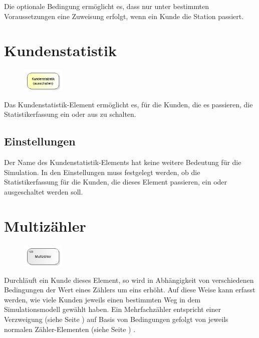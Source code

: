 Die optionale Bedingung ermöglicht es, dass nur unter bestimmten Voraussetzungen eine Zuweisung erfolgt,
wenn ein Kunde die Station passiert.


\section{Kundenstatistik}
\label{ref:ModelElementSetStatisticsMode}

\begin{figure}
\vspace{-22pt}
\includegraphics[width=2cm]{imageModelElementSetStatisticsMode.png}
\vspace{-22pt}
\end{figure}

Das Kundenstatistik-Element ermöglicht es, für die Kunden, die es passieren,
die Statistikerfassung ein oder aus zu schalten.

\subsection*{Einstellungen}

Der Name des Kundenstatistik-Elements hat keine weitere Bedeutung für die Simulation.
In den Einstellungen muss festgelegt werden, ob die Statistikerfassung für die Kunden,
die dieses Element passieren, ein oder ausgeschaltet werden soll.


\section{Multizähler}
\label{ref:ModelElementCounterMulti}

\begin{figure}
\vspace{-22pt}
\includegraphics[width=2cm]{imageModelElementCounterMulti.png}
\vspace{-22pt}
\end{figure}

Durchläuft ein Kunde dieses Element, so wird in Abhängigkeit von verschiedenen Bedingungen
der Wert eines Zählers um eins erhöht. Auf diese Weise kann erfasst werden, wie viele Kunden
jeweils einen bestimmten Weg in dem Simulationsmodell gewählt haben. Ein Mehrfachzähler
entspricht einer Verzweigung (siehe Seite \pageref{ref:ModelElementDecide}) auf Basis von Bedingungen
gefolgt von jeweils normalen Zähler-Elementen (siehe Seite \pageref{ref:ModelElementCounter}) .


